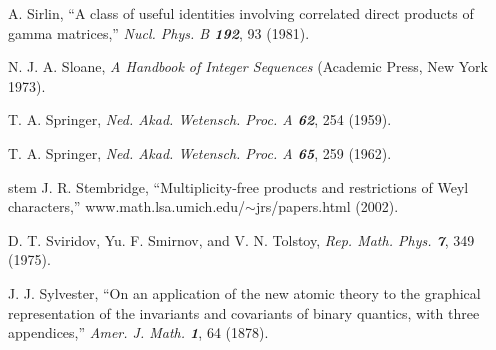A. Sirlin,
``A class of useful identities involving correlated direct products of gamma
matrices,''
{\em Nucl.  Phys.  B  \bf 192}, 93 (1981).


N. J. A. Sloane,
     {\em A Handbook of Integer Sequences}
(Academic Press, New York 1973).

 T. A. Springer,
{\em Ned. Akad. Wetensch. Proc.   A \bf 62}, 254 (1959).

 T. A. Springer,
{\em Ned. Akad. Wetensch. Proc.   A \bf 65}, 259 (1962).




        {stem} J. R. Stembridge,
 ``Multiplicity-free products and restrictions of Weyl characters,''
          {www.math.lsa.umich.edu/$\sim$jrs/papers.html} (2002).

 D. T. Sviridov, Yu. F. Smirnov, and V. N. Tolstoy,
{\em Rep. Math. Phys.  \bf 7}, 349 (1975).

 J. J. Sylvester,
``On an application of the new atomic theory to the graphical
  representation of the invariants and covariants of binary quantics,
  with three appendices,''
{\em  Amer. J. Math. \bf 1}, 64 (1878). %

